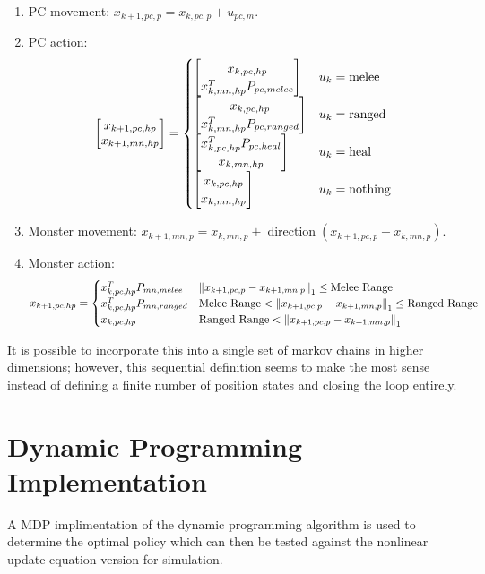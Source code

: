 \documentclass[letterpaper, 10 pt, conference]{ieeeconf}
\begin{document}
\begin{enumerate}
    \item PC movement: $x_{k+1,pc,p} = x_{k,pc,p} + u_{pc,m}$.
    \item PC action: \[
        \mqty[x_{k+1,pc,hp}\\ x_{k+1,mn,hp}] = \begin{cases}
            \mqty[x_{k,pc,hp}\\x_{k,mn,hp}^T P_{pc,melee}] & u_k = \text{melee}\\
            \mqty[x_{k,pc,hp}\\x_{k,mn,hp}^T P_{pc,ranged}] & u_k = \text{ranged}\\
            \mqty[x_{k,pc,hp}^T P_{pc,heal}\\ x_{k,mn,hp}] & u_k = \text{heal}\\
            \mqty[x_{k,pc,hp}\\x_{k,mn,hp}] & u_k = \text{nothing}
        \end{cases}
    \]
    \item Monster movement: $x_{k+1,mn,p} = x_{k,mn,p} + \operatorname{direction}(x_{k+1,pc,p} - x_{k,mn,p})$.
    \item Monster action:\[
        x_{k+1,pc,hp} = \begin{cases}
            x_{k,pc,hp}^T P_{mn,melee}  & \norm{x_{k+1,pc,p} - x_{k+1,mn,p}}_1 \leq \text{Melee Range}\\
            x_{k,pc,hp}^T P_{mn,ranged} & \text{Melee Range} < \norm{x_{k+1,pc,p} - x_{k+1,mn,p}}_1 \leq \text{Ranged Range}\\
            x_{k,pc,hp} & \text{Ranged Range} < \norm{x_{k+1,pc,p} - x_{k+1,mn,p}}_1
        \end{cases}
    \]
\end{enumerate}

It is possible to incorporate this into a single set of markov chains in higher dimensions; however, this sequential definition seems to make the most sense instead of defining a finite number of position states and closing the loop entirely.


\section{Dynamic Programming Implementation}
A MDP implimentation of the dynamic programming algorithm is used to determine the optimal policy which can then be tested against the nonlinear update equation version for simulation.
\end{document}
